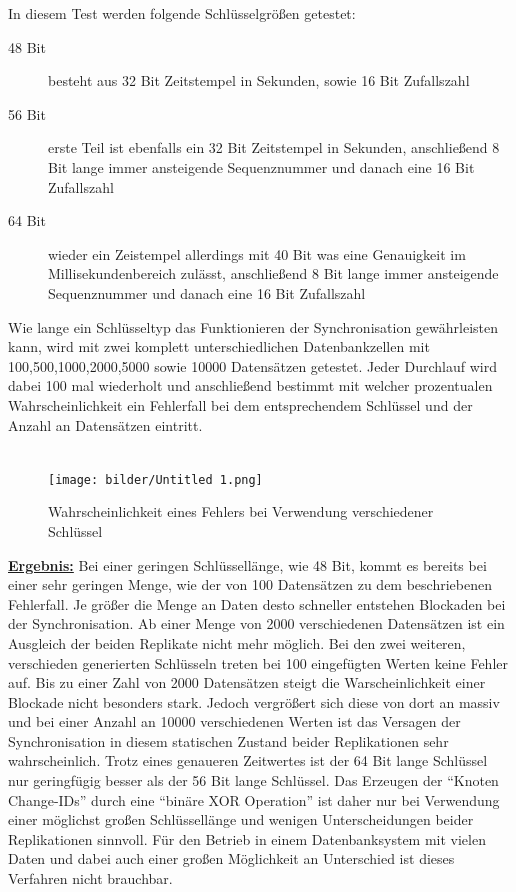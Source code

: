 \documentclass[a4paper,11pt,oneside,%
headsepline,												%
footsepline,												%
bibtotocnumbered									%
]{scrreprt}
\begin{document}
In diesem Test werden folgende Schlüsselgrößen getestet:
\begin{description}
	\item[48 Bit] besteht aus 32 Bit Zeitstempel in Sekunden, sowie 16 Bit Zufallszahl
	\item[56 Bit] erste Teil ist ebenfalls ein 32 Bit Zeitstempel in Sekunden, anschließend 8 Bit lange immer ansteigende Sequenznummer und danach eine 16 Bit Zufallszahl
	\item[64 Bit] wieder ein Zeistempel allerdings mit 40 Bit was eine Genauigkeit im Millisekundenbereich zulässt, anschließend 8 Bit lange immer ansteigende Sequenznummer und danach eine 16 Bit Zufallszahl
\end{description}
	
Wie lange ein Schlüsseltyp das Funktionieren der Synchronisation gewährleisten kann, wird mit zwei komplett unterschiedlichen Datenbankzellen mit 100,500,1000,2000,5000 sowie 10000  Datensätzen getestet. Jeder Durchlauf wird dabei 100 mal wiederholt und anschließend bestimmt mit welcher prozentualen Wahrscheinlichkeit ein Fehlerfall bei dem entsprechendem Schlüssel und der Anzahl an Datensätzen eintritt.\\\\
\begin{figure}[h!]
    \centering
    \texttt{[image: bilder/Untitled 1.png]}
    \caption{Wahrscheinlichkeit eines Fehlers bei Verwendung verschiedener Schlüssel}
\end{figure}
\underline{{\bf Ergebnis:}} Bei einer geringen Schlüssellänge, wie 48 Bit, kommt es bereits bei einer sehr geringen Menge, wie der von 100 Datensätzen zu dem beschriebenen Fehlerfall. Je größer die Menge an Daten desto schneller entstehen Blockaden bei der Synchronisation. Ab einer Menge von 2000 verschiedenen Datensätzen ist ein Ausgleich der beiden Replikate nicht mehr möglich. Bei den zwei weiteren, verschieden generierten Schlüsseln treten bei 100 eingefügten Werten keine Fehler auf. Bis zu einer Zahl von 2000 Datensätzen steigt die Warscheinlichkeit einer Blockade nicht besonders stark. Jedoch vergrößert sich diese von dort an massiv und bei einer Anzahl an 10000 verschiedenen Werten ist das Versagen der Synchronisation in diesem statischen Zustand beider Replikationen sehr wahrscheinlich. Trotz eines genaueren Zeitwertes ist der 64 Bit lange Schlüssel nur geringfügig besser als der 56 Bit lange Schlüssel. Das Erzeugen der \enquote{Knoten Change-IDs} durch eine \enquote{binäre XOR Operation} ist daher nur bei Verwendung einer möglichst großen Schlüssellänge und wenigen Unterscheidungen beider Replikationen sinnvoll. Für den Betrieb in einem Datenbanksystem mit vielen Daten und dabei auch einer großen Möglichkeit an Unterschied ist dieses Verfahren nicht brauchbar.\\\\
\end{document}
